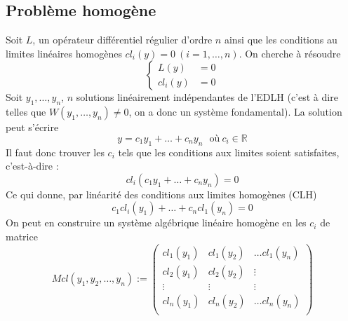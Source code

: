 \documentclass[british,french,11pt, a4paper, openany]{book}
\begin{document}
		\subsection{Problème homogène}
		Soit $L$, un opérateur différentiel régulier d'ordre $n$ ainsi que les conditions au limites linéaires homogènes $cl_i(y) =0\ (i=1,\dots,n)$. On cherche à résoudre
		\begin{equation}
			\left\{\begin{array}{ll}
			L(y) &=0\\
			cl_i(y) &= 0
			\end{array}\right.
		\end{equation}
		Soit $y_1,\dots,y_n$, $n$ solutions linéairement indépendantes de l'EDLH (c'est à dire telles que $W(y_1,\dots,y_n)\neq 0$, on a donc un système fondamental). La solution peut s'écrire
		\begin{equation}
			y = c_1y_1 + \dots + c_ny_n\ \ \ \text{où}\ c_i \in \mathbb{R}
		\end{equation}
		Il faut donc trouver les $c_i$ tels que les conditions aux limites soient satisfaites, c'est-à-dire :
		\begin{equation}
			cl_i(c_1y_1 + \dots + c_ny_n) = 0
		\end{equation}
		Ce qui donne, par linéarité des conditions aux limites homogènes (CLH)
		\begin{equation}
			c_1cl_i(y_1) + \dots + c_ncl_1(y_n) = 0
		\end{equation}
		On peut en construire un système algébrique linéaire homogène en les $c_i$ de matrice
		\begin{equation}
			Mcl(y_1, y_2, \dots, y_n) := \left(\begin{array}{ccc}
			cl_1(y_1) & cl_1(y_2) & \dots cl_1(y_n)\\
			cl_2(y_1) & cl_2(y_2) & \vdots\\
			\vdots & \vdots & \vdots \\
			cl_n(y_1) & cl_n(y_2) & \dots cl_n(y_n)\\
			\end{array}\right)
		\end{equation}
									
									
\end{document}
